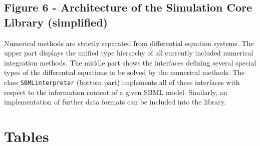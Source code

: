 \documentclass[10pt]{bmc_article}
\newenvironment{bmcformat}{\baselineskip20pt\sloppy\setboolean{publ}{false}}{\baselineskip20pt\sloppy}
\newcommand{\SBMLinterpreter}{\texttt{SBML\-interpreter}}
\begin{document}
\begin{bmcformat}
  \subsection*{Figure 6 - Architecture of the Simulation Core Library
  (simplified)}
  
Numerical methods are strictly separated from differential equation systems. The
upper part displays the unified type hierarchy of all currently included numerical integration
methods. The middle part shows the interfaces defining several
special types of the differential equations to be solved by the numerical
methods.
The class \SBMLinterpreter{} (bottom part) implements all of these interfaces
with respect to the information content of a given SBML model. Similarly, an
implementation of further data formats can be included into the
library.




\section*{Tables}


\end{bmcformat}
\end{document}
